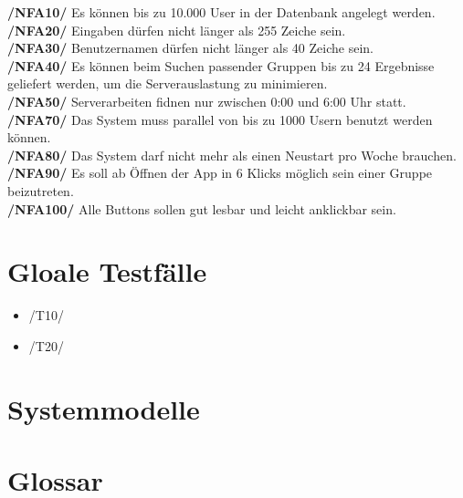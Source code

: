 \documentclass[a4paper]{scrreprt}
\begin{document}
\begin{addmargin}[25pt]{0pt} 

\textbf{/NFA10/} Es können bis zu 10.000 User in der Datenbank angelegt werden.\\
\textbf{/NFA20/} Eingaben dürfen nicht länger als 255 Zeiche sein.\\
\textbf{/NFA30/} Benutzernamen dürfen nicht länger als 40 Zeiche sein.\\
\textbf{/NFA40/} Es können beim Suchen passender Gruppen bis zu 24 Ergebnisse geliefert werden, um die Serverauslastung zu minimieren.\\
\textbf{/NFA50/} Serverarbeiten fidnen nur zwischen 0:00 und 6:00 Uhr statt.\\
\textbf{/NFA70/} Das System muss parallel von bis zu 1000 Usern benutzt werden können.\\
\textbf{/NFA80/} Das System darf nicht mehr als einen Neustart pro Woche brauchen.\\
\textbf{/NFA90/} Es soll ab Öffnen der App in 6 Klicks möglich sein einer Gruppe beizutreten.\\
\textbf{/NFA100/} Alle Buttons sollen gut lesbar und leicht anklickbar sein.\\

\end{addmargin}


\chapter{Gloale Testfälle}
\begin{itemize}
\item /T10/ 
\item /T20/

\end{itemize}

\chapter{Systemmodelle}

\chapter{Glossar}
 

 
\end{document}
